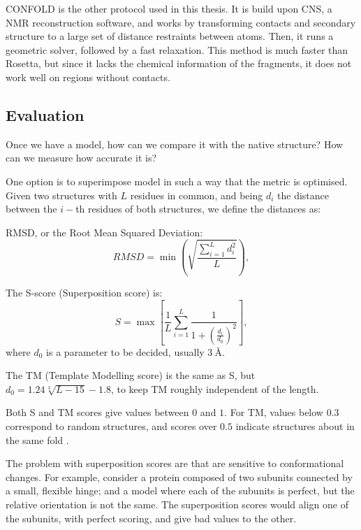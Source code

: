 CONFOLD \citep{confold}  is the other protocol used in this thesis.
It is build upon CNS, a NMR reconstruction software, and works by transforming contacts and secondary structure to a large set of distance restraints between atoms.
Then, it runs a geometric solver, followed by a fast relaxation.
This method is much faster than Rosetta, but since it lacks the chemical information of the fragments, it does not work well on regions without contacts.


\subsection{Evaluation}
Once we have a model, how can we compare it with the native structure? How can we measure how accurate it is?

One option is to superimpose model 
in such a way that the metric is optimised.
Given two structures with $L$ residues in common, and being $d_i$ the distance between the $i-$th residues of both structures, we define the distances as:

RMSD, or the Root Mean Squared Deviation:
\begin{equation*}
RMSD = \min \left(\sqrt{\frac{\sum_{i=1}^L d_i^2}{L}}\right),
\end{equation*}

The S-score (Superposition score) is:
\begin{equation*}
S = \max\left[\frac{1}{L} \sum_{i=1}^L \frac{1}{1 + \left(\frac{d_i}{d_0}\right)^2}\right],
\end{equation*}
where $d_0$ is a parameter to be decided, usually $\SI{3}{\angstrom}$.

The TM (Template Modelling score) is the same as S, but $d_0 = 1.24 \sqrt[3]{L - 15} - 1.8$, to keep TM roughly independent of the length.

Both S and TM scores give values between $0$ and $1$.
For TM, values below $0.3$ correspond to random structures, and scores over $0.5$ indicate structures about in the same fold \citep{tmscore05}.

The problem with superposition scores are that are sensitive to conformational changes.
For example, consider a protein composed of two subunits connected by a small, flexible hinge; and a model where each of the subunits is perfect, but the relative orientation is not the same.
The superposition scores would align one of the subunits, with perfect scoring, and give bad values to the other.

